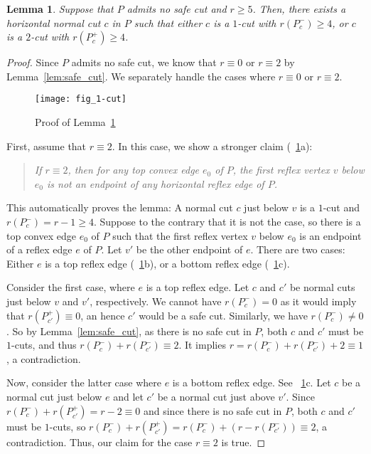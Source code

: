 \documentclass[11pt]{article}
\newtheorem{lemma}{Lemma}
\theoremstyle{definition}
\let\geq\geqslant
\begin{document}
\begin{lemma} \label{lem:1-cut}
 Suppose that $P$ admits no safe cut and $r\geq 5$.
 Then, there exists a horizontal normal cut $c$ in $P$ such that
 either $c$ is a $1$-cut with $r(P^-_c) \geq 4$, or $c$ is a $2$-cut with $r(P^+_c) \geq 4$.
\end{lemma}
\begin{proof}
Since $P$ admits no safe cut, we know that $r \equiv 0$ or $r \equiv 2$
by Lemma~\ref{lem:safe_cut}.
We separately handle the cases where $r \equiv 0$ or $r\equiv 2$.

\begin{figure}[tb]
\centering
\texttt{[image: fig\_1-cut]}
\caption{Proof of Lemma~\ref{lem:1-cut}}
\label{fig:1-cut}
\end{figure}


First, assume that $r\equiv 2$.
In this case, we show a stronger claim (\figurename~\ref{fig:1-cut}a):
\begin{quote}
\textit{If $r\equiv 2$, then for any top convex edge $e_0$ of $P$,
the first reflex vertex $v$ below $e_0$ is not an endpoint of any horizontal reflex edge of $P$.}
\end{quote}
This automatically proves the lemma: A normal cut $c$ just below $v$ is a $1$-cut and
$r(P^-_c) = r - 1 \geq 4$.
Suppose to the contrary that it is not the case,
so there is a top convex edge $e_0$ of $P$ such that
the first reflex vertex $v$ below $e_0$ is an endpoint of a reflex edge $e$ of $P$.
Let $v'$ be the other endpoint of $e$.
There are two cases: Either $e$ is a top reflex edge (\figurename~\ref{fig:1-cut}b), 
or a bottom reflex edge (\figurename~\ref{fig:1-cut}c).

Consider the first case, where $e$ is a top reflex edge.
Let $c$ and $c'$ be normal cuts just below $v$ and $v'$, respectively.
We cannot have $r(P^-_c)=0$ as it would imply that  $r(P^+_{c'}) \equiv 0$, an hence
$c'$ would be a safe cut. Similarly, we have $r(P^-_c) \neq 0$.
So by Lemma~\ref{lem:safe_cut}, as there is no safe cut in $P$, 
both $c$ and $c'$ must be $1$-cuts, and thus $r(P^-_c) + r(P^-_{c'}) \equiv 2$.
It implies $r=r(P^-_c) + r(P^-_{c'})+2 \equiv 1$, a contradiction.

Now, consider the latter case where $e$ is a bottom reflex edge.
See \figurename~\ref{fig:1-cut}c.
Let $c$ be a normal cut just below $e$ and let $c'$ be a normal cut just above $v'$.
Since $r(P^-_c) + r(P^+_{c'}) = r - 2 \equiv 0$ and since
there is no safe cut in $P$, both $c$ and $c'$ must be $1$-cuts,
so $r(P^-_c) + r(P^+_{c'}) = r(P^-_c) + ( r - r(P^-_{c'})) \equiv 2$, a contradiction.
Thus, our claim for the case $r \equiv 2$ is true.


\end{proof}
\end{document}
